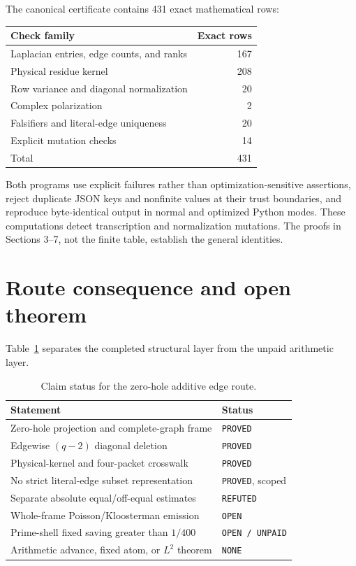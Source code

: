 \documentclass[11pt]{article}
\begin{document}
The canonical certificate contains 431 exact mathematical rows:
\begin{center}
\begin{tabular}{lr}
\toprule
Check family & Exact rows\\
\midrule
Laplacian entries, edge counts, and ranks & 167\\
Physical residue kernel & 208\\
Row variance and diagonal normalization & 20\\
Complex polarization & 2\\
Falsifiers and literal-edge uniqueness & 20\\
Explicit mutation checks & 14\\
\midrule
Total & 431\\
\bottomrule
\end{tabular}
\end{center}
Both programs use explicit failures rather than optimization-sensitive
assertions, reject duplicate JSON keys and nonfinite values at their trust
boundaries, and reproduce byte-identical output in normal and optimized
Python modes.  These computations detect transcription and normalization
mutations.  The proofs in Sections 3--7, not the finite table, establish the
general identities.

\section{Route consequence and open theorem}

Table~\ref{tab:status} separates the completed structural layer from the
unpaid arithmetic layer.

\begin{table}[ht]
\centering
\caption{Claim status for the zero-hole additive edge route.}
\label{tab:status}
\begin{tabular}{p{}p{}}
\toprule
Statement & Status\\
\midrule
Zero-hole projection and complete-graph frame & \texttt{PROVED}\\
Edgewise $(q-2)$ diagonal deletion & \texttt{PROVED}\\
Physical-kernel and four-packet crosswalk & \texttt{PROVED}\\
No strict literal-edge subset representation & \texttt{PROVED}, scoped\\
Separate absolute equal/off-equal estimates & \texttt{REFUTED}\\
Whole-frame Poisson/Kloosterman emission & \texttt{OPEN}\\
Prime-shell fixed saving greater than $1/400$ & \texttt{OPEN / UNPAID}\\
Arithmetic advance, fixed atom, or $L^2$ theorem & \texttt{NONE}\\
\bottomrule
\end{tabular}
\end{table}
\end{document}
